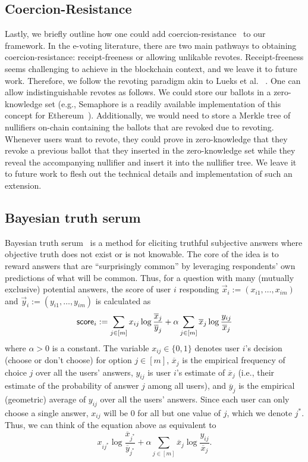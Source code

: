 \subsection{Coercion-Resistance}\label{sec:extension_coercion_resistance}
Lastly, we briefly outline how one could add coercion-resistance~\cite{WPES:JueCatJak05} to our framework. In the e-voting literature, there are two main pathways to obtaining coercion-resistance: receipt-freeness or allowing unlikable revotes. Receipt-freeness seems challenging to achieve in the blockchain context, and we leave it to future work.  Therefore, we follow the revoting paradigm akin to Lueks et al. ~\cite{USENIX:LueQueTro20}. One can allow indistinguishable revotes as follows. We could store our ballots in a zero-knowledge set (e.g., Semaphore is a readily available implementation of this concept for Ethereum~\cite{semaphore}). Additionally, we would need to store a Merkle tree of nullifiers on-chain containing the ballots that are revoked due to revoting. Whenever users want to revote, they could prove in zero-knowledge that they revoke a previous ballot that they inserted in the zero-knowledge set while they reveal the accompanying nullifier and insert it into the nullifier tree. We leave it to future work to flesh out the technical details and implementation of such an extension.

\subsection{Bayesian truth serum}\label{sec:bayesian_truth}

Bayesian truth serum~\cite{Prelec04} is a method for eliciting truthful subjective answers where objective truth does not exist or is not knowable. The core of the idea is to reward answers that are ``surprisingly common'' by leveraging respondents' own predictions of what will be common. Thus, for a question with many (mutually exclusive) potential answers, the score of user $i$ responding $\vec{x}_i := (x_{i1}, \dots, x_{im})$ and $\vec{y}_i := (y_{i1}, \dots, y_{im})$ is calculated as
%
\begin{equation}\label{eqn:bts}
    {\sf score}_i := \sum_{j \in [m]} x_{ij} \log{\frac{\overline{x}_j}{\overline{y}_j}} + \alpha \sum_{j \in [m]} \overline{x}_j \log{\frac{y_{ij}}{\overline{x}_j}}
\end{equation}
%
where $\alpha > 0$ is a constant. The variable $x_{ij} \in \{0,1\}$ denotes user $i$'s decision (choose or don't choose) for option $j \in [m]$, $\overline{x}_j$ is the empirical frequency of choice $j$ over all the users' answers, $y_{ij}$ is user $i$'s estimate of $\overline{x}_j$ (i.e., their estimate of the probability of answer $j$ among all users), and $\overline{y}_j$ is the empirical (geometric) average of $y_{ij}$ over all the users' answers. Since each user can only choose a single answer, $x_{ij}$ will be 0 for all but one value of $j$, which we denote $j^*$. Thus, we can think of the equation above as equivalent to
%
\[
    x_{ij^*} \log{\frac{\overline{x}_{j^*}}{\overline{y}_{j^*}}} + \alpha \sum_{j \in [m]} \overline{x}_j \log{\frac{y_{ij}}{\overline{x}_j}}.
\]

